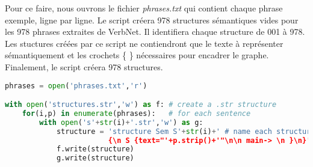 Pour ce faire, nous ouvrons le fichier \emph{phrases.txt} qui contient chaque phrase exemple, ligne par ligne. Le script créera 978 structures sémantiques vides pour les 978 phrases extraites de VerbNet. Il identifiera chaque structure de 001 à 978. Les stuctures créées par ce script ne contiendront que le texte à représenter sémantiquement et les crochets \{ \} nécessaires pour encadrer le graphe. Finalement, le script créera 978 structures.

\begin{lstlisting}[language=Python, caption = Création des structures sémantiques vides, label=structurepython]
phrases = open('phrases.txt','r')

with open('structures.str','w') as f: # create a .str structure
    for(i,p) in enumerate(phrases):   # for each sentence
        with open('s'+str(i)+'.str','w') as g:
            structure = 'structure Sem S'+str(i)+' # name each structure by enumeration
						{\n S {text="'+p.strip()+'"\n\n main-> \n }\n}' # insert as texte the sentence
            f.write(structure)
            g.write(structure)
\end{lstlisting}

